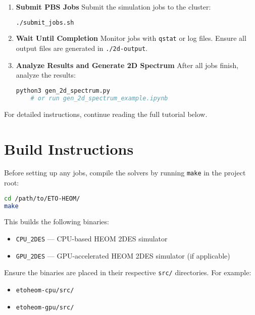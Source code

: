 \documentclass{article}
\begin{document}
\begin{enumerate}
    \item \textbf{Submit PBS Jobs}  
    Submit the simulation jobs to the cluster:
    \begin{lstlisting}[language=bash]
    ./submit_jobs.sh
    \end{lstlisting}

    \item \textbf{Wait Until Completion}  
    Monitor jobs with \texttt{qstat} or log files. Ensure all output files are generated in \texttt{./2d-output}.

    \item \textbf{Analyze Results and Generate 2D Spectrum}  
    After all jobs finish, analyze the results:
    \begin{lstlisting}[language=bash]
    python3 gen_2d_spectrum.py
    # or run gen_2d_spectrum_example.ipynb
    \end{lstlisting}
\end{enumerate}

\vspace{1em}
For detailed instructions, continue reading the full tutorial below.

\newpage

\section{Build Instructions}

Before setting up any jobs, compile the solvers by running \texttt{make} in the project root:

\begin{lstlisting}[language=bash]
cd /path/to/ETO-HEOM/
make
\end{lstlisting}

This builds the following binaries:

\begin{itemize}
    \item \texttt{CPU\_2DES} --- CPU-based HEOM 2DES simulator
    \item \texttt{GPU\_2DES} --- GPU-accelerated HEOM 2DES simulator (if applicable)
\end{itemize}

Ensure the binaries are placed in their respective \texttt{src/} directories. For example:

\begin{itemize}
    \item \texttt{etoheom-cpu/src/}
    \item \texttt{etoheom-gpu/src/}
\end{itemize}
\end{document}
